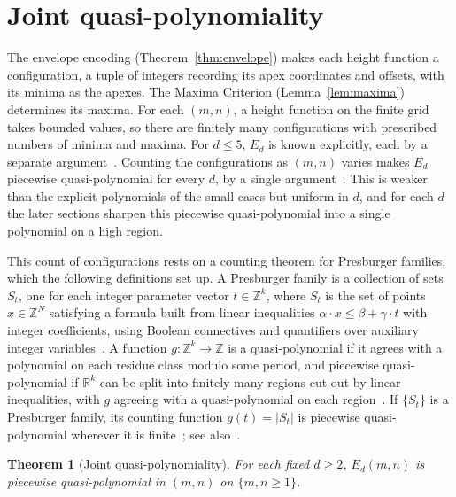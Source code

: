 \documentclass[11pt]{article}
\newtheorem{theorem}{Theorem}[section]
\theoremstyle{definition}
\theoremstyle{remark}
\newcommand{\Z}{\mathbb{Z}}
\begin{document}
\section{Joint quasi-polynomiality}\label{sec:quasipoly}

The envelope encoding (Theorem~\ref{thm:envelope}) makes each height function a
configuration, a tuple of integers recording its apex coordinates and offsets,
with its minima as the apexes. The Maxima Criterion (Lemma~\ref{lem:maxima})
determines its maxima. For each $(m,n)$, a height function on the finite grid
takes bounded values, so there are finitely many configurations with prescribed
numbers of minima and maxima. For $d\le5$, $E_d$ is known explicitly, each by a
separate argument~\cite{Gupta2026companion}. Counting the configurations as $(m,n)$ varies makes
$E_d$ piecewise quasi-polynomial for every $d$, by a single
argument~\cite{BogartWoods2022}. This is weaker than the
explicit polynomials of the small cases but uniform in $d$, and for each $d$ the
later sections sharpen this piecewise quasi-polynomial into a single polynomial
on a high region.

This count of configurations rests on a counting theorem for Presburger families, which the following definitions set up.
A Presburger family is a collection of sets $S_t$, one for each integer
parameter vector
$t\in\Z^k$, where $S_t$ is the set of points $x\in\Z^N$ satisfying a formula built
from linear inequalities $\alpha\cdot x\le\beta+\gamma\cdot t$ with integer
coefficients, using Boolean connectives and quantifiers over auxiliary
integer variables~\cite[Def.~7]{BogartWoods2022}.
A function $g:\Z^k\to\Z$ is a quasi-polynomial if it agrees with a
polynomial on each residue class modulo some period, and
piecewise quasi-polynomial if $\mathbb{R}^k$ can be split into finitely many
regions cut out by linear inequalities, with $g$ agreeing with a
quasi-polynomial on each region~\cite[Defs.~4--5]{BogartWoods2022}. If $\{S_t\}$ is a
Presburger family, its counting function $g(t)=\lvert S_t\rvert$ is piecewise
quasi-polynomial wherever it is finite~\cite[Thm.~1.10]{Woods2015}; see
also~\cite[Thm.~2, Property~2]{BogartWoods2022}.

\begin{theorem}[Joint quasi-polynomiality]\label{thm:quasipoly}
For each fixed $d\ge2$, $E_d(m,n)$ is piecewise quasi-polynomial in $(m,n)$
on $\{m,n\ge1\}$.
\end{theorem}
\end{document}
